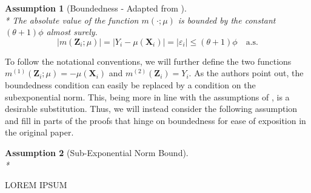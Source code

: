 \documentclass[letterpaper,10pt]{article}
\numberwithin{equation}{section}
\numberwithin{thm}{section}
\numberwithin{lem}{section}
\numberwithin{cor}{section}
\newtheorem{asm}{Assumption}
\newcommand{\1}{\mathbbm{1}}
\begin{document}
\begin{asm}[Boundedness - Adapted from \citet{ritzwoller_uniform_2024}]\mbox{}\\*
	The absolute value of the function $m(\cdot; \mu)$ is bounded by the constant $(\theta+1) \phi$ almost surely.
	\begin{equation}
		|m(\mathbf{Z}_i ; \mu)|
		= |Y_i - \mu(\mathbf{X}_i)|
		= |\varepsilon_i|
		\leq (\theta+1) \phi
		\quad \text{a.s.}
	\end{equation}
\end{asm}
To follow the notational conventions, we will further define the two functions $m^{(1)}(\mathbf{Z}_i; \mu) = - \mu(\mathbf{X}_i)$ and $m^{(2)}(\mathbf{Z}_i) = Y_i$.
As the authors point out, the boundedness condition can easily be replaced by a condition on the subexponential norm.
This, being more in line with the assumptions of \citet{demirkaya_optimal_2024}, is a desirable substitution.
Thus, we will instead consider the following assumption and fill in parts of the proofs that hinge on boundedness for ease of exposition in the original paper.


\begin{asm}[Sub-Exponential Norm Bound]\mbox{}\\*

\end{asm}

{\color{red} LOREM IPSUM}

% 


\end{document}
